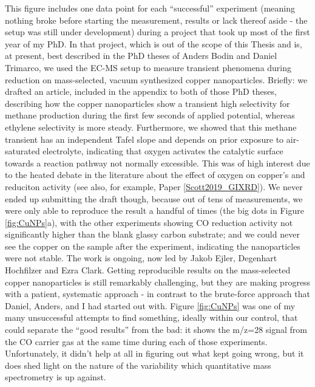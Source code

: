 This figure includes one data point for each ``successful'' experiment (meaning nothing broke before starting the measurement, results or lack thereof aside - the setup was still under development) during a project that took up most of the first year of my PhD. In that project, which is out of the scope of this Thesis and is, at present, best described in the PhD theses of Anders Bodin\cite{Bodin2017_PhD} and Daniel Trimarco\cite{Trimarco2017_PhD}, we used the EC-MS setup to measure transient phenomena during  reduction on mass-selected, vacuum synthesized copper nanoparticles. Briefly: we drafted an article, included in the appendix to both of those PhD theses, describing how the copper nanoparticles show a transient high selectivity for methane production during the first few seconds of applied potential, whereas ethylene selectivity is more steady. Furthermore, we showed that this methane transient has an independent Tafel slope and depends on prior exposure to air-saturated electrolyte, indicating that oxygen activates the catalytic surface towards a reaction pathway not normally excessible. This was of high interest due to the heated debate in the literature about the effect of oxygen on copper's  and  reduciton activity\cite{Mistry2016, Gao2017a, Eilert2017, Nitopi2019} (see also, for example, Paper \ref{Scott2019_GIXRD}). We never ended up submitting the draft though, because out of tens of measurements, we were only able to reproduce the result a handful of times (the big dots in Figure \ref{fig:CuNPs}a), with the other experiments showing CO reduction activity not significantly higher than the blank glassy carbon substrate; and we could never see the copper on the sample after the experiment, indicating the nanoparticles were not stable. The work is ongoing, now led by Jakob Ejler, Degenhart Hochfilzer and Ezra Clark. Getting reproducible results on the mass-selected copper nanoparticles is still remarkably challenging, but they are making progress with a patient, systematic approach - in contrast to the brute-force approach that Daniel, Anders, and I had started out with. Figure \ref{fig:CuNPs} was one of my many unsuccessful attempts to find something, ideally within our control, that could separate the ``good results'' from the bad: it shows the m/z=28 signal from the CO carrier gas at the same time during each of those experiments. Unfortunately, it didn't help at all in figuring out what kept going wrong, but it does shed light on the nature of the variability which quantitative mass spectrometry is up against.

